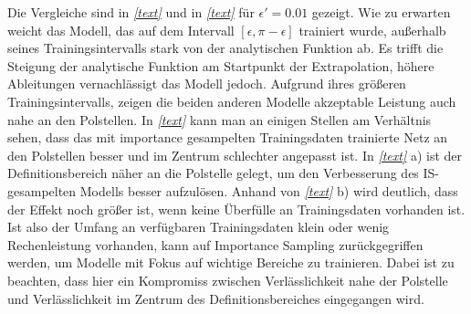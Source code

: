 Die Vergleiche sind in \textit{\autoref{text}} und in \textit{\autoref{text}} für $\epsilon' = 0.01$ gezeigt. Wie zu erwarten weicht das Modell, das auf dem Intervall $[\epsilon, \pi-\epsilon]$ trainiert wurde, außerhalb seines Trainingsintervalls stark von der analytischen Funktion ab. Es trifft die Steigung der analytische Funktion am Startpunkt der Extrapolation, höhere Ableitungen vernachlässigt das Modell jedoch. Aufgrund ihres größeren Trainingsintervalls, zeigen die beiden anderen Modelle akzeptable Leistung auch nahe an den Polstellen. In \textit{\autoref{text}} kann man an einigen Stellen am Verhältnis sehen, dass das mit importance gesampelten Trainingsdaten trainierte Netz an den Polstellen besser und im Zentrum schlechter angepasst ist. In \textit{\autoref{text}} a) ist der Definitionsbereich näher an die Polstelle gelegt, um den Verbesserung des IS-gesampelten Modells besser aufzulösen. Anhand von \textit{\autoref{text}} b) wird deutlich, dass der Effekt noch größer ist, wenn keine Überfülle an Trainingsdaten vorhanden ist. Ist also der Umfang an verfügbaren Trainingsdaten klein oder wenig Rechenleistung vorhanden, kann auf Importance Sampling zurückgegriffen werden, um Modelle mit Fokus auf wichtige Bereiche zu trainieren. Dabei ist zu beachten, dass hier ein Kompromiss zwischen Verlässlichkeit nahe der Polstelle und Verlässlichkeit im Zentrum des Definitionsbereiches eingegangen wird.

